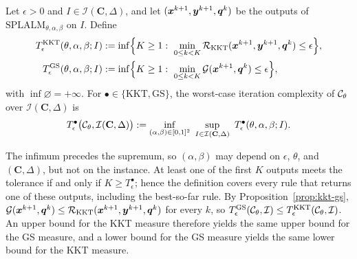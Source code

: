 \begin{definition}
\label{def:complexity-measure}
Let \(\epsilon>0\) and \(I\in\mathcal I(\mathbf C,\Delta)\), and let
\((\bm{x}^{k+1},\bm{y}^{k+1},\bm{q}^k)\) be the outputs of
\(\mathrm{SPLALM}_{\theta,\alpha,\beta}\) on \(I\). Define
\[
\begin{aligned}
    T^{\mathrm{KKT}}_\epsilon(\theta,\alpha,\beta;I)
    &:=\inf\Bigl\{K\ge1:\ \min_{0\le k<K}
        \mathcal R_{\mathrm{KKT}}(\bm{x}^{k+1},\bm{y}^{k+1},\bm{q}^k)\le\epsilon\Bigr\},\\
    T^{\mathrm{GS}}_\epsilon(\theta,\alpha,\beta;I)
    &:=\inf\Bigl\{K\ge1:\ \min_{0\le k<K}
        \mathcal{G}(\bm{x}^{k+1},\bm{q}^k)\le\epsilon\Bigr\},
\end{aligned}
\]
with \(\inf\varnothing=+\infty\). For \(\bullet\in\{\mathrm{KKT},\mathrm{GS}\}\),
the worst-case iteration complexity of \(\mathcal{C}_\theta\) over
\(\mathcal I(\mathbf C,\Delta)\) is
\[
    T^{\bullet}_\epsilon\bigl(\mathcal{C}_\theta,\mathcal I(\mathbf C,\Delta)\bigr)
    :=\inf_{(\alpha,\beta)\in[0,1]^2}\
    \sup_{I\in\mathcal I(\mathbf C,\Delta)}\
    T^{\bullet}_\epsilon(\theta,\alpha,\beta;I).
\]
\end{definition}

The infimum precedes the supremum, so \((\alpha,\beta)\) may depend on
\(\epsilon\), \(\theta\), and \((\mathbf C,\Delta)\), but not on the instance.
At least one of the first \(K\) outputs meets the tolerance if and only if
\(K\ge T^{\bullet}_\epsilon\); hence the definition covers every rule that
returns one of these outputs, including the best-so-far rule. By
Proposition~\ref{prop:kkt-gs},
\(\mathcal{G}(\bm{x}^{k+1},\bm{q}^k)\le\mathcal R_{\mathrm{KKT}}(\bm{x}^{k+1},\bm{y}^{k+1},\bm{q}^k)\)
for every \(k\), so
\(T^{\mathrm{GS}}_\epsilon(\mathcal{C}_\theta,\mathcal I)
\le T^{\mathrm{KKT}}_\epsilon(\mathcal{C}_\theta,\mathcal I)\). An upper bound for
the KKT measure therefore yields the same upper bound for the GS measure, and
a lower bound for the GS measure yields the same lower bound for the KKT
measure.

